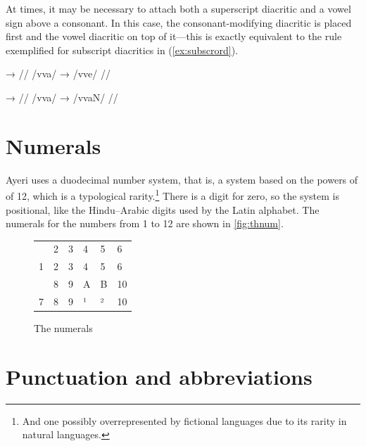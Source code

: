 At times, it may be necessary to attach both a superscript diacritic and a 
vowel sign above a consonant. In this case, the consonant-modifying diacritic 
is placed first and the vowel diacritic on top of it---this is exactly 
equivalent to the rule exemplified for subscript diacritics in 
(\ref{ex:subscrord}).

\pex[lingstyle=thex]\label{ex:subscrord2}
\a\begingl
	\gla {}	→	 //
	\glb /vva/	→	/vve/ //
\endgl

\a\begingl
	\gla {}	→	 //
	\glb /vva/	→	/vvaN/ //
\endgl
\xe


\section{Numerals}

Ayeri uses a duodecimal number system, that is, a system based on the powers of
of 12, which is a typological rarity.\footnote{And one possibly overrepresented
by fictional languages due to its rarity in natural languages.} There is a
digit for zero, so the system is positional, like the Hindu–Arabic digits used
by the Latin alphabet. The numerals for the numbers from 1 to 12 are shown in
\autoref{fig:thnum}.

\begin{figure}[t]
\caption{The numerals}

\begin{tabu} to \linewidth{X[c] X[c] X[c] X[c] X[c] X[c]}
\toprule
{} & 2 & 3 & 4 & 5 & 6 \\
\rowfont{\Tagati\huge}	1 & 2 & 3 & 4 & 5 & 6 \\

\midrule

 & 8 & 9 & A & B & 10 \\
\rowfont{\Tagati\huge}	7 & 8 & 9 & ¹ & ² & 10 \\

\bottomrule
\end{tabu}
\label{fig:thnum}
\end{figure}



\section{Punctuation and abbreviations}


